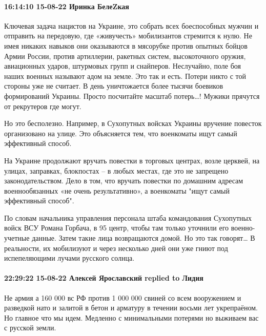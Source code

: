  
 
 
 
 

\paragraph{16:14:10 15-08-22 Иринка БелеZкая}

Ключевая задача нацистов на Украине, это собрать всех боеспособных мужчин и
отправить на передовую, где «живучесть» мобилизантов стремится к нулю. Не имея
никаких навыков они оказываются в мясорубке против опытных бойцов Армии России,
против артиллерии, ракетных систем, высокоточного оружия, авиационных ударов,
штурмовых групп и снайперов. Неслучайно, поле боя наших военных называют адом
на земле. Это так и есть. Потери никто с той стороны уже не считает. В день
уничтожается более тысячи боевиков формирований Украины. Просто посчитайте
масштаб потерь…! Мужики прячутся от рекрутеров где могут.

Но это бесполезно. Например, в Сухопутных войсках Украины вручение повесток
организовано на улице. Это объясняется тем, что военкоматы ищут самый
эффективный способ.

На Украине продолжают вручать повестки в торговых центрах, возле церквей, на
улицах, заправках, блокпостах – в любых местах, где это не запрещено
законодательством. Дело в том, что вручать повестки по домашним адресам
военнообязанных «не очень результативно», а военкоматы "ищут самый эффективный
способ".

По словам начальника управления персонала штаба командования Сухопутных войск
ВСУ Романа Горбача, в 95%
центр, чтобы там только уточнили его военно-учетные данные. Затем такие лица
возвращаются домой. Но это так говорят… В реальности, их мобилизуют и через
несколько дней они уже гниют под испепеляющими лучами русского солнца.

\paragraph{22:29:22 15-08-22 Алексей Ярославский replied to Лидия}

Не армия а 160 000 вс РФ против 1 000 000 свиней со всем вооружением и
разведкой нато и залитой в бетон и арматуру в течении восьми лет укрепраёном.
Но главное что мы идем. Медленно с минимальными потерями но выживаем вас с
русской земли.

